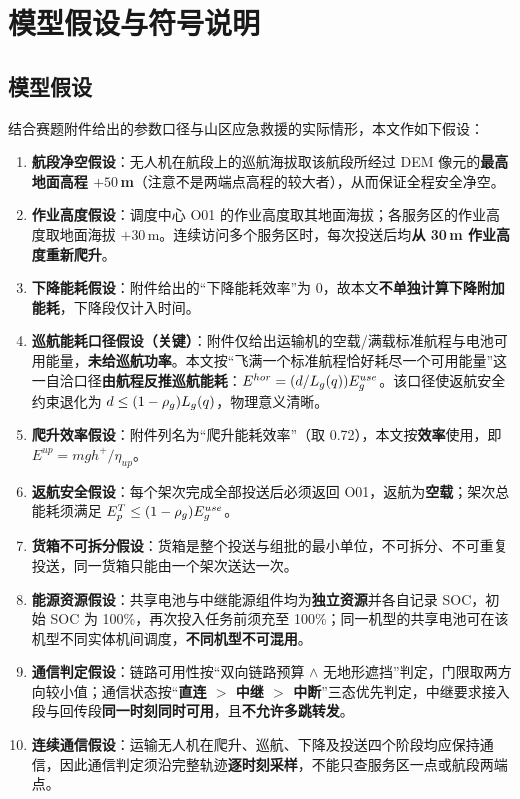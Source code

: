 \section{模型假设与符号说明}
\subsection{模型假设}

结合赛题附件给出的参数口径与山区应急救援的实际情形，本文作如下假设：

\begin{enumerate}[label=\textbf{假设 \arabic*}]
	\item \textbf{航段净空假设}：无人机在航段上的巡航海拔取该航段所经过 DEM 像元的\textbf{最高地面高程 $+50$\,m}（注意不是两端点高程的较大者），从而保证全程安全净空。
	\item \textbf{作业高度假设}：调度中心 O01 的作业高度取其地面海拔；各服务区的作业高度取地面海拔 $+30$\,m。连续访问多个服务区时，每次投送后均\textbf{从 30\,m 作业高度重新爬升}。
	\item \textbf{下降能耗假设}：附件给出的“下降能耗效率”为 0，故本文\textbf{不单独计算下降附加能耗}，下降段仅计入时间。
	\item \textbf{巡航能耗口径假设（关键）}：附件仅给出运输机的空载/满载标准航程与电池可用能量，\textbf{未给巡航功率}。本文按“飞满一个标准航程恰好耗尽一个可用能量”这一自洽口径\textbf{由航程反推巡航能耗}：$E^{hor}=(d/L_{g}(q))E_{g}^{use}$。该口径使返航安全约束退化为 $d\le(1-\rho_{g})L_{g}(q)$，物理意义清晰。
	\item \textbf{爬升效率假设}：附件列名为“爬升能耗效率”（取 0.72），本文按\textbf{效率}使用，即 $E^{up}=mgh^{+}/\eta_{up}$。
	\item \textbf{返航安全假设}：每个架次完成全部投送后必须返回 O01，返航为\textbf{空载}；架次总能耗须满足 $E_{p}^{T}\le(1-\rho_{g})E_{g}^{use}$。
	\item \textbf{货箱不可拆分假设}：货箱是整个投送与组批的最小单位，不可拆分、不可重复投送，同一货箱只能由一个架次送达一次。
	\item \textbf{能源资源假设}：共享电池与中继能源组件均为\textbf{独立资源}并各自记录 SOC，初始 SOC 为 100\%，再次投入任务前须充至 100\%；同一机型的共享电池可在该机型不同实体机间调度，\textbf{不同机型不可混用}。
	\item \textbf{通信判定假设}：链路可用性按“双向链路预算 $\wedge$ 无地形遮挡”判定，门限取两方向较小值；通信状态按“\textbf{直连 $>$ 中继 $>$ 中断}”三态优先判定，中继要求接入段与回传段\textbf{同一时刻同时可用}，且\textbf{不允许多跳转发}。
	\item \textbf{连续通信假设}：运输无人机在爬升、巡航、下降及投送四个阶段均应保持通信，因此通信判定须沿完整轨迹\textbf{逐时刻采样}，不能只查服务区一点或航段两端点。

\end{enumerate}
